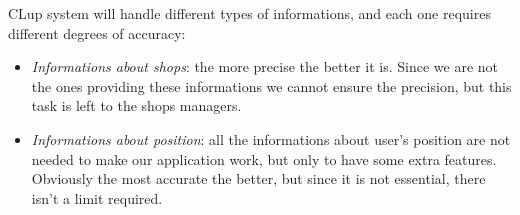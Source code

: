 CLup system will handle different types of informations, and each one requires different degrees of accuracy:
\begin{itemize}[topsep=0pt]
    \item \textit{Informations about shops}: the more precise the better it is. Since we are not the ones providing these informations we cannot ensure the precision, but this task is left to the shops managers.
    \item \textit{Informations about position}: all the informations about user's position are not needed to make our application work, but only to have some extra features. Obviously the most accurate the better, but since it is not essential, there isn't a limit required.
\end{itemize}